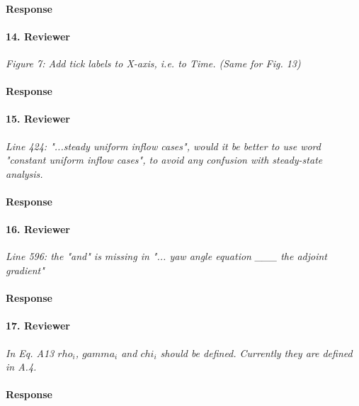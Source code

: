 \documentclass[]{article}
\begin{document}
\paragraph{Response} 

\hrulefill

\paragraph{14. Reviewer} \textit{Figure 7: Add tick labels to X-axis, i.e. to Time. (Same for Fig. 13)}

\paragraph{Response} 

\hrulefill

\paragraph{15. Reviewer} \textit{Line 424: "...steady uniform inflow cases", would it be better to use word "constant uniform inflow cases", to avoid any confusion with steady-state analysis.}

\paragraph{Response} 

\hrulefill

\paragraph{16. Reviewer} \textit{Line 596: the "and" is missing in "... yaw angle equation \_\_\_ the adjoint gradient"}

\paragraph{Response} 

\hrulefill

\paragraph{17. Reviewer} \textit{In Eq. A13 $rho_i$, $gamma_i$ and $chi_i$ should be defined. Currently they are defined in A.4.}

\paragraph{Response} 

\hrulefill
\end{document}
